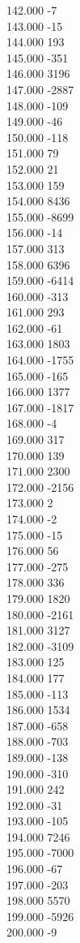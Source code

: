 { 142.000	-7 \\
 143.000	-15 \\
 144.000	193 \\
 145.000	-351 \\
 146.000	3196 \\
 147.000	-2887 \\
 148.000	-109 \\
 149.000	-46 \\
 150.000	-118 \\
 151.000	79 \\
 152.000	21 \\
 153.000	159 \\
 154.000	8436 \\
 155.000	-8699 \\
 156.000	-14 \\
 157.000	313 \\
 158.000	6396 \\
 159.000	-6414 \\
 160.000	-313 \\
 161.000	293 \\
 162.000	-61 \\
 163.000	1803 \\
 164.000	-1755 \\
 165.000	-165 \\
 166.000	1377 \\
 167.000	-1817 \\
 168.000	-4 \\
 169.000	317 \\
 170.000	139 \\
 171.000	2300 \\
 172.000	-2156 \\
 173.000	2 \\
 174.000	-2 \\
 175.000	-15 \\
 176.000	56 \\
 177.000	-275 \\
 178.000	336 \\
 179.000	1820 \\
 180.000	-2161 \\
 181.000	3127 \\
 182.000	-3109 \\
 183.000	125 \\
 184.000	177 \\
 185.000	-113 \\
 186.000	1534 \\
 187.000	-658 \\
 188.000	-703 \\
 189.000	-138 \\
 190.000	-310 \\
 191.000	242 \\
 192.000	-31 \\
 193.000	-105 \\
 194.000	7246 \\
 195.000	-7000 \\
 196.000	-67 \\
 197.000	-203 \\
 198.000	5570 \\
 199.000	-5926 \\
 200.000	-9 \\
}
